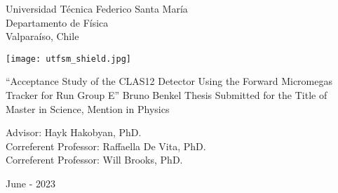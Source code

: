 \begin{titlepage}
\begin{center}
    \noindent
    \fontsize{18pt}{22pt}\selectfont Universidad T\'ecnica Federico Santa Mar\'ia \\
    \fontsize{16pt}{19pt}\selectfont Departamento de F\'isica \\
    \fontsize{16pt}{19pt}\selectfont Valpara\'iso, Chile \\
    \vspace{1.5cm}

    \texttt{[image: utfsm\_shield.jpg]}
    \vspace{1.5cm}

    \fontsize{20pt}{24pt}\selectfont ``Acceptance Study of the CLAS12 Detector Using the Forward Micromegas Tracker for Run Group E''
    \vfill
    \fontsize{16pt}{19pt}\selectfont Bruno Benkel
    \vfill
    \fontsize{16pt}{19pt}\selectfont Thesis Submitted for the Title of \\ Master in Science, Mention in Physics
    \vspace{1.5cm}

    \fontsize{14pt}{17pt}\selectfont Advisor: Hayk Hakobyan, PhD. \\
    \fontsize{14pt}{17pt}\selectfont Correferent Professor: Raffaella De Vita, PhD. \\
    \fontsize{14pt}{17pt}\selectfont Correferent Professor: Will Brooks, PhD.
    \vspace{2.5cm}

    \fontsize{14pt}{17pt}\selectfont June - 2023
\end{center}
\end{titlepage}

       \pagebreak
 \pagebreak
         \pagebreak
         \pagebreak
\tableofcontents                         \pagebreak
{} {}
\listoffigures                           \pagebreak
